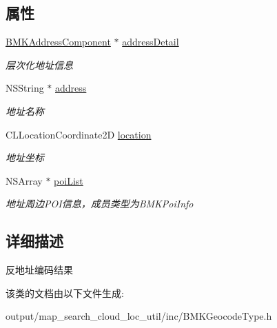 \subsection*{属性}
\begin{DoxyCompactItemize}
\item 
\hypertarget{interface_b_m_k_reverse_geo_code_result_acde5aee09b57f17a58b7f557e3ad4758}{\hyperlink{interface_b_m_k_address_component}{B\+M\+K\+Address\+Component} $\ast$ \hyperlink{interface_b_m_k_reverse_geo_code_result_acde5aee09b57f17a58b7f557e3ad4758}{address\+Detail}}\label{interface_b_m_k_reverse_geo_code_result_acde5aee09b57f17a58b7f557e3ad4758}

\begin{DoxyCompactList}\small\item\em 层次化地址信息 \end{DoxyCompactList}\item 
\hypertarget{interface_b_m_k_reverse_geo_code_result_a069818e5afe4ee4041d7484d70e1e3bb}{N\+S\+String $\ast$ \hyperlink{interface_b_m_k_reverse_geo_code_result_a069818e5afe4ee4041d7484d70e1e3bb}{address}}\label{interface_b_m_k_reverse_geo_code_result_a069818e5afe4ee4041d7484d70e1e3bb}

\begin{DoxyCompactList}\small\item\em 地址名称 \end{DoxyCompactList}\item 
\hypertarget{interface_b_m_k_reverse_geo_code_result_ae7afa6e87f1c8fc31a17dbccf15588da}{C\+L\+Location\+Coordinate2\+D \hyperlink{interface_b_m_k_reverse_geo_code_result_ae7afa6e87f1c8fc31a17dbccf15588da}{location}}\label{interface_b_m_k_reverse_geo_code_result_ae7afa6e87f1c8fc31a17dbccf15588da}

\begin{DoxyCompactList}\small\item\em 地址坐标 \end{DoxyCompactList}\item 
\hypertarget{interface_b_m_k_reverse_geo_code_result_a6c9fd2997504cff3b99569f5f89dba20}{N\+S\+Array $\ast$ \hyperlink{interface_b_m_k_reverse_geo_code_result_a6c9fd2997504cff3b99569f5f89dba20}{poi\+List}}\label{interface_b_m_k_reverse_geo_code_result_a6c9fd2997504cff3b99569f5f89dba20}

\begin{DoxyCompactList}\small\item\em 地址周边\+P\+O\+I信息，成员类型为\+B\+M\+K\+Poi\+Info \end{DoxyCompactList}\end{DoxyCompactItemize}


\subsection{详细描述}
反地址编码结果 

该类的文档由以下文件生成\+:\begin{DoxyCompactItemize}
\item 
output/map\+\_\+search\+\_\+cloud\+\_\+loc\+\_\+util/inc/B\+M\+K\+Geocode\+Type.\+h\end{DoxyCompactItemize}
